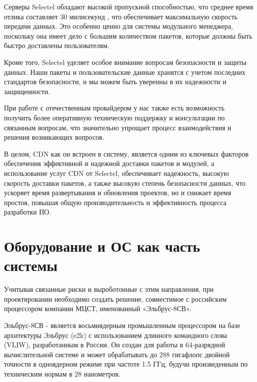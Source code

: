 Серверы Selectel обладают высокой пропускной способностью, что среднее время отлика составляет 30 милисекунд \cite{cdn:selectel}, что обеспечивает максимальную скорость передачи данных. Это особенно ценно для системы модульного менеджера, поскольку она имеет дело с большим количеством пакетов, которые должны быть быстро доставлены пользователям.

Кроме того, Selectel уделяет особое внимание вопросам безопасности и защиты данных. Наши пакеты и пользовательские данные хранятся с учетом последних стандартов безопасности, и мы можем быть уверенны в их надежности и защищенности.

При работе с отечественным провайдером у нас также есть возможность получить более оперативную техническую поддержку и консультации по связанным вопросам, что значительно упрощает процесс взаимодействия и решения возникающих вопросов.

В целом, CDN как он встроен в систему, является одним из ключевых факторов обеспечения эффективной и надежной доставки пакетов и модулей, а использование услуг CDN от Selectel, обеспечивает надежность, высокую скорость доставки пакетов, а также высокую степень безопасности данных, что ускоряет время развертывания и обновления проектов, но и снижает время простоя, повышая общую производительность и эффективность процесса разработки ПО.

\section{Оборудование и ОС как часть системы}

Учитывая связанные риски и выроботонные с этим направления, при проектировании необходимо создать решение, совместимое с российским процессором компании МЦСТ, именованный «Эльбрус-8СВ».

Эльбрус-8СВ - является восьмиядерным промышленным процессором на базе архитектуры Эльбрус (e2k) с использованием длинного командного слова (VLIW), разработанным в России. Он создан для работы в 64-разрядной вычислительной системе и может обрабатывать до 288 гигафлопс двойной точности в одноядерном режиме при частоте 1.5 ГГц, будучи произведенным по техническим нормам в 28 нанометров. 



